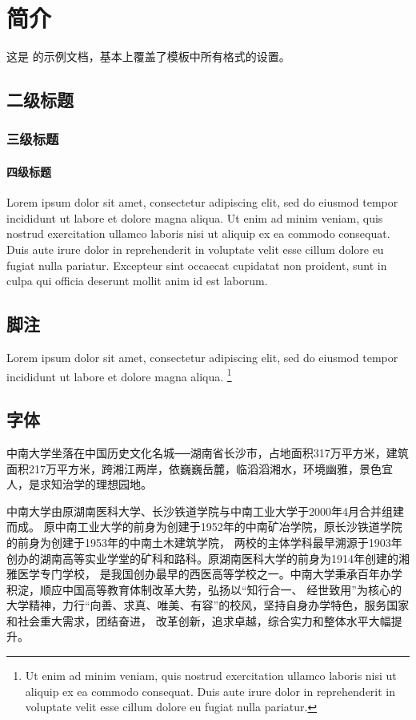 
\chapter{简介}

这是 \csuthesis 的示例文档，基本上覆盖了模板中所有格式的设置。

\section{二级标题}

\subsection{三级标题}

\subsubsection{四级标题}

Lorem ipsum dolor sit amet, consectetur adipiscing elit, sed do eiusmod tempor
incididunt ut labore et dolore magna aliqua. Ut enim ad minim veniam, quis
nostrud exercitation ullamco laboris nisi ut aliquip ex ea commodo consequat.
Duis aute irure dolor in reprehenderit in voluptate velit esse cillum dolore eu
fugiat nulla pariatur. Excepteur sint occaecat cupidatat non proident, sunt in
culpa qui officia deserunt mollit anim id est laborum.

\section{脚注}

Lorem ipsum dolor sit amet, consectetur adipiscing elit, sed do eiusmod tempor
incididunt ut labore et dolore magna aliqua. \footnote{Ut enim ad minim veniam,
  quis nostrud exercitation ullamco laboris nisi ut aliquip ex ea commodo
  consequat. Duis aute irure dolor in reprehenderit in voluptate velit esse cillum
  dolore eu fugiat nulla pariatur.}

\section{字体}

 {\songti 中南大学坐落在中国历史文化名城──湖南省长沙市，占地面积317万平方米，建筑面积217万平方米，跨湘江两岸，依巍巍岳麓，临滔滔湘水，环境幽雅，景色宜人，是求知治学的理想园地。
 }

 {\heiti 中南大学由原湖南医科大学、长沙铁道学院与中南工业大学于2000年4月合并组建而成。
  原中南工业大学的前身为创建于1952年的中南矿冶学院，原长沙铁道学院的前身为创建于1953年的中南土木建筑学院，
  两校的主体学科最早溯源于1903年创办的湖南高等实业学堂的矿科和路科。原湖南医科大学的前身为1914年创建的湘雅医学专门学校，
  是我国创办最早的西医高等学校之一。中南大学秉承百年办学积淀，顺应中国高等教育体制改革大势，弘扬以“知行合一、
  经世致用”为核心的大学精神，力行“向善、求真、唯美、有容”的校风，坚持自身办学特色，服务国家和社会重大需求，团结奋进，
  改革创新，追求卓越，综合实力和整体水平大幅提升。
 }

